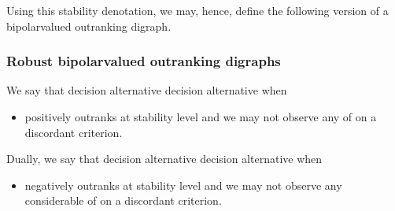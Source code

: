 \documentclass[a4paper,12pt,english]{sphinxhowto}
\begin{document}
\sphinxAtStartPar
Using this stability denotation, we may, hence, define the following  version of a bipolar\sphinxhyphen{}valued outranking digraph.


\subsubsection{Robust bipolar\sphinxhyphen{}valued outranking digraphs}
\label{\detokenize{pearls:robust-bipolar-valued-outranking-digraphs}}
\sphinxAtStartPar
We say that decision alternative   decision alternative  when
\begin{itemize}
\item {} 
\sphinxAtStartPar
{} positively outranks  at stability level  and we may not observe any  of  on a discordant criterion.

\end{itemize}

\sphinxAtStartPar
Dually, we say that decision alternative   decision alternative  when
\begin{itemize}
\item {} 
\sphinxAtStartPar
{} negatively outranks  at stability level  and we may not observe any considerable  of  on a discordant criterion.

\end{itemize}
\end{document}
